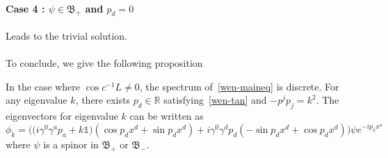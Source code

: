 \paragraph{Case 4 : $\psi \in \mathfrak{B}_+$ and $p_d = 0$}
Leads to the trivial solution. \\\\
To conclude, we give the following proposition
\begin{proposition}
In the case where $\cos c^{-1}L \neq 0$,
the spectrum of~\cref{wen-maineq} is discrete.
For any eigenvalue $k$, there exists $p_d\in \mathbb{R}$ satisfying~\cref{wen-tan} and $-p^jp_j = k^2$.
The eigenvectors for eigenvalue $k$ can be written as 
\begin{equation*}
\phi_k = \Big(\big(i\gamma^0\gamma^a p_a+k\mathbb{1}\big)(\cos p_d x^d + \sin p_d x^d) +
i\gamma^0\gamma^d p_d(-\sin p_d x^d + \cos p_d x^d)\Big) \psi e^{-ip_a x^a}
\end{equation*}
where $\psi$ is a spinor in $\mathfrak{B}_+$ or $\mathfrak{B}_-$.
\end{proposition}




